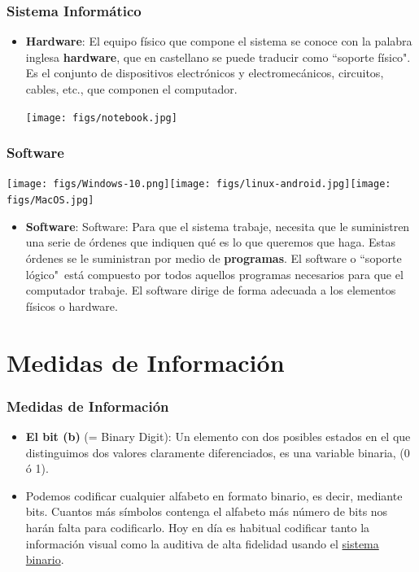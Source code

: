 \documentclass[aspectratio=169]{beamer}
\begin{document}
\begin{frame}[fragile]\frametitle{Sistema Informático}
\begin{itemize}
\item \textbf{Hardware}: El equipo físico que compone el sistema se conoce con la palabra inglesa \textbf{hardware}, que en castellano se puede traducir como ``soporte físico". Es el conjunto de dispositivos electrónicos y electromecánicos, circuitos, cables, etc., que componen el computador.
\begin{center}
\texttt{[image: figs/notebook.jpg]}
\end{center}
\end{itemize}
\end{frame}

\begin{frame}[fragile]\frametitle{Software}
\begin{center}
\texttt{[image: figs/Windows-10.png]}\hfill\texttt{[image: figs/linux-android.jpg]}\hfill\texttt{[image: figs/MacOS.jpg]}
\end{center}
\begin{itemize}
\item \textbf{Software}: Software: Para que el sistema trabaje, necesita que le suministren una serie de órdenes que indiquen qué es lo que queremos que haga. Estas órdenes se le suministran por medio de \textbf{programas}. El software o ``soporte lógico"\, está compuesto por todos aquellos programas necesarios para que el computador trabaje. El software dirige de forma adecuada a los elementos físicos o hardware.
\end{itemize}
\end{frame}

\section{Medidas de Información}
\begin{frame}[fragile]\frametitle{Medidas de Información}
\begin{itemize}
\item \textbf{El bit (b)} (= Binary Digit): Un elemento con dos posibles estados en el que distinguimos dos valores claramente diferenciados, es una variable binaria, (0 ó 1).
\item Podemos codificar cualquier alfabeto en formato binario, es decir, mediante bits. Cuantos más símbolos contenga el alfabeto más número de bits nos harán falta para codificarlo. Hoy en día es habitual codificar tanto la información visual como la auditiva de alta fidelidad usando el \href{https://es.wikipedia.org/wiki/Sistema_binario}{sistema binario}.
\end{itemize}
\end{frame}
\end{document}

